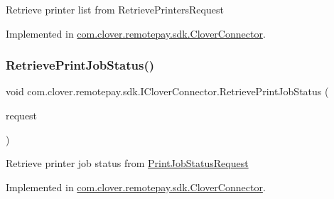 Retrieve printer list from Retrieve\+Printers\+Request 



Implemented in \hyperlink{classcom_1_1clover_1_1remotepay_1_1sdk_1_1_clover_connector_af655f211944ed467d58eb816e5752c3c}{com.\+clover.\+remotepay.\+sdk.\+Clover\+Connector}.

\mbox{\label{interfacecom_1_1clover_1_1remotepay_1_1sdk_1_1_i_clover_connector_a36a6d360ab810558e7a78e9d09bffc5e}} 
\subsubsection{\texorpdfstring{Retrieve\+Print\+Job\+Status()}{RetrievePrintJobStatus()}}
{\footnotesize\ttfamily void com.\+clover.\+remotepay.\+sdk.\+I\+Clover\+Connector.\+Retrieve\+Print\+Job\+Status (\begin{DoxyParamCaption}\item[{\hyperlink{classcom_1_1clover_1_1remotepay_1_1sdk_1_1_print_job_status_request}{Print\+Job\+Status\+Request}}]{request }\end{DoxyParamCaption})}



Retrieve printer job status from \hyperlink{classcom_1_1clover_1_1remotepay_1_1sdk_1_1_print_job_status_request}{Print\+Job\+Status\+Request} 



Implemented in \hyperlink{classcom_1_1clover_1_1remotepay_1_1sdk_1_1_clover_connector_a9c52815121d86654b8372a24b05874bd}{com.\+clover.\+remotepay.\+sdk.\+Clover\+Connector}.

\mbox{\label{interfacecom_1_1clover_1_1remotepay_1_1sdk_1_1_i_clover_connector_acc92394e6902137c559510e498e78529}} 
